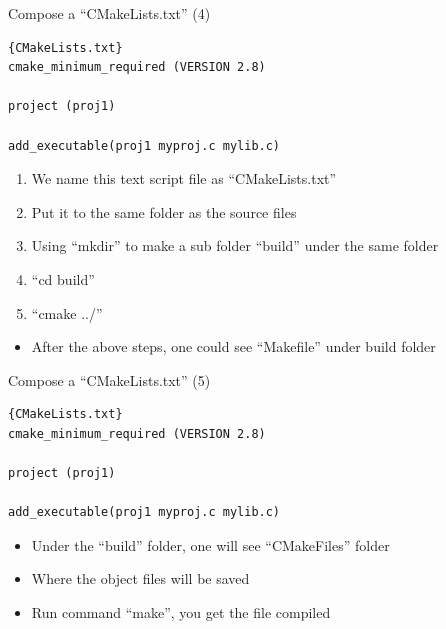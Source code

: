 \begin{frame}[fragile]{Compose a ``CMakeLists.txt'' (4)}
\begin{lstlisting}[linewidth=0.95\linewidth, firstnumber= 1, xleftmargin=0.02\linewidth]{CMakeLists.txt}
cmake_minimum_required (VERSION 2.8)

project (proj1)

add_executable(proj1 myproj.c mylib.c)
\end{lstlisting}

\begin{enumerate}
	\item {We name this text script file as ``CMakeLists.txt''}
	\vspace{0.1in}
	\item {Put it to the same folder as the source files}
	\vspace{0.1in}
	\item {Using ``mkdir'' to make a sub folder ``build'' under the same folder}
	\vspace{0.10in}
	\item {``cd build''}
	\vspace{0.10in}
	\item {``cmake ../''}
\end{enumerate}
\begin{itemize}
	\item {After the above steps, one could see ``Makefile'' under build folder}
\end{itemize}
\end{frame}

\begin{frame}[fragile]{Compose a ``CMakeLists.txt'' (5)}
\begin{lstlisting}[linewidth=0.95\linewidth, firstnumber= 1, xleftmargin=0.02\linewidth]{CMakeLists.txt}
cmake_minimum_required (VERSION 2.8)

project (proj1)

add_executable(proj1 myproj.c mylib.c)
\end{lstlisting}

\begin{itemize}
	\item {Under the ``build'' folder, one will see ``CMakeFiles'' folder}
	\item {Where the object files will be saved}
	\item {Run command ``make'', you get the file compiled}
\end{itemize}
\end{frame}

